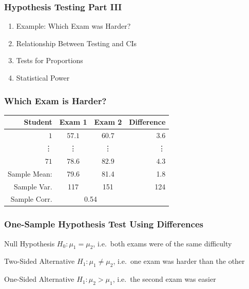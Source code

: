 \documentclass[handout]{beamer}
\begin{document}

\begin{frame}
\frametitle{Hypothesis Testing Part III}
	\begin{enumerate}
\item Example: Which Exam was Harder?
\item Relationship Between Testing and CIs
\item Tests for Proportions 
\item \alert{Statistical Power}
\end{enumerate}
\end{frame}

\begin{frame}
\frametitle{Which Exam is Harder?}
%
\begin{table}[!tbp]
\begin{center}
\begin{tabular}{rccr}
\hline\hline
\multicolumn{1}{r}{Student}&\multicolumn{1}{c}{Exam 1}&\multicolumn{1}{c}{Exam 2}&\multicolumn{1}{r}{Difference}\tabularnewline
\hline
$ 1$&$57.1$&$60.7$&$  3.6$\tabularnewline
\vdots&\vdots&\vdots&\vdots\\
$71$&$78.6$&$82.9$&$  4.3$\tabularnewline
\hline
Sample Mean: & 79.6 & 81.4  &1.8\\
Sample Var. &117  & 151 & 124\\
Sample Corr.& \multicolumn{2}{c}{0.54}&\\
\hline
\end{tabular}
\end{center}
\end{table}

\end{frame}
\begin{frame}
\frametitle{One-Sample Hypothesis Test Using Differences}
\small
{}
\vspace{0.1em}
\begin{block}{Null Hypothesis}
$H_0\colon \mu_1 = \mu_2$, i.e.\ both exams were of the same difficulty
\end{block}
\begin{block}{Two-Sided Alternative}
$H_1\colon \mu_1 \neq \mu_2$, i.e.\ one exam was harder than the other
\end{block}
\begin{block}{One-Sided Alternative}
$H_1\colon \mu_2 > \mu_1$, i.e.\ the second exam was easier
\end{block}

\end{frame}
\end{document}
